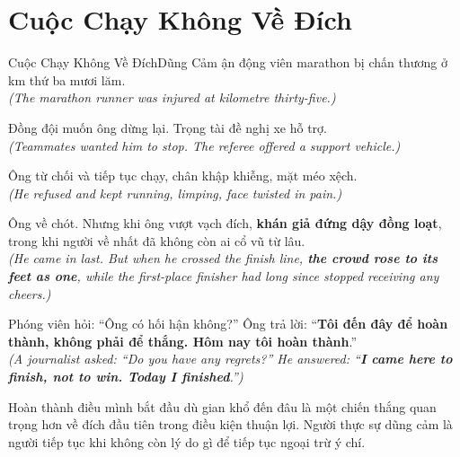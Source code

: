 \section{Cuộc Chạy Không Về Đích}
\begin{truyen}{Cuộc Chạy Không Về Đích}{Dũng Cảm}
ận động viên marathon bị chấn thương ở km thứ ba mươi lăm.\\
\textit{(The marathon runner was injured at kilometre thirty-five.)}

Đồng đội muốn ông dừng lại. Trọng tài đề nghị xe hỗ trợ.\\
\textit{(Teammates wanted him to stop. The referee offered a support vehicle.)}

Ông từ chối và tiếp tục chạy, chân khập khiễng, mặt méo xệch.\\
\textit{(He refused and kept running, limping, face twisted in pain.)}

Ông về chót. Nhưng khi ông vượt vạch đích, \textbf{khán giả đứng dậy đồng loạt}, trong khi người về nhất đã không còn ai cổ vũ từ lâu.\\
\textit{(He came in last. But when he crossed the finish line, \textbf{the crowd rose to its feet as one}, while the first-place finisher had long since stopped receiving any cheers.)}

Phóng viên hỏi: ``Ông có hối hận không?'' Ông trả lời: ``\textbf{Tôi đến đây để hoàn thành, không phải để thắng. Hôm nay tôi hoàn thành}.''\\
\textit{(A journalist asked: ``Do you have any regrets?'' He answered: ``\textbf{I came here to finish, not to win. Today I finished}.'')}
\end{truyen}
\begin{baihoc}
  Hoàn thành điều mình bắt đầu dù gian khổ đến đâu là một chiến thắng quan trọng hơn về đích đầu tiên trong điều kiện thuận lợi. Người thực sự dũng cảm là người tiếp tục khi không còn lý do gì để tiếp tục ngoại trừ ý chí.
\end{baihoc}

